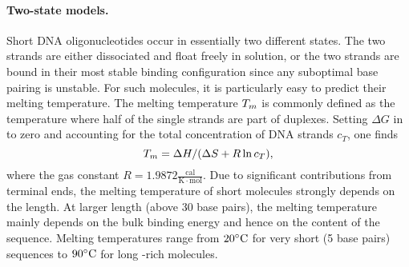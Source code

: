 \paragraph{Two-state models.} 
Short DNA oligonucleotides occur in essentially two different states. The two strands are either
dissociated and float freely in solution, or the two strands are bound in their most stable binding 
configuration since any suboptimal base pairing is unstable. 
For such molecules, it is particularly easy to predict their melting temperature. 
The melting temperature $T_m$ is commonly defined as the temperature where half of the 
single strands are part of duplexes. Setting $\Delta G$ in  to zero and accounting for the 
 total concentration of DNA strands $c_T$, one finds \cite{SantaLucia_PNAS_98}
\begin{equation}
\label{eq:DNA_two_state_Tm}
T_m = \Delta H/(\Delta S+R \ln c_T),
\end{equation}
where the gas constant $R=1.9872\frac{\mathrm{cal}}{\mathrm{K\cdot mol}}$.
Due to significant contributions from terminal ends, the melting temperature of short 
molecules strongly depends on the length. At larger length (above 30 base pairs), the melting temperature
mainly depends on the bulk binding energy and hence on the  content of the sequence. 
Melting temperatures range from $20{}^{\circ}\mathrm{C}$ for very short (5 base pairs) sequences 
to $90{}^{\circ}\mathrm{C}$ for long -rich molecules.

